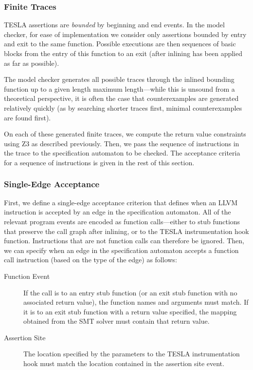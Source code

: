 \subsubsection{Finite Traces}

TESLA assertions are \emph{bounded} by beginning and end events. In the model
checker, for ease of implementation we consider only assertions bounded by entry
and exit to the same function. Possible executions are then sequences of basic
blocks from the entry of this function to an exit (after inlining has been
applied as far as possible).

The model checker generates all possible traces through the inlined bounding
function up to a given length maximum length---while this is unsound from a
theoretical perspective, it is often the case that counterexamples are generated
relatively quickly (as by searching shorter traces first, minimal
counterexamples are found first).

On each of these generated finite traces, we compute the return value
constraints using Z3 as described previously. Then, we pass the sequence of
instructions in the trace to the specification automaton to be checked. The
acceptance criteria for a sequence of instructions is given in the rest of this
section.

\subsubsection{Single-Edge Acceptance}

First, we define a single-edge acceptance criterion that defines when an LLVM
instruction is accepted by an edge in the specification automaton. All of the
relevant program events are encoded as function calls---either to stub functions
that preserve the call graph after inlining, or to the TESLA instrumentation
hook function. Instructions that are not function calls can therefore be
ignored. Then, we can specify when an edge in the specification automaton
accepts a function call instruction (based on the type of the edge) as follows:
\begin{description}
  \item[Function Event] If the call is to an entry stub function (or an exit
    stub function with no associated return value), the function
    names and arguments must match. If it is to an exit stub function with a
    return value specified, the mapping obtained from the SMT solver must
    contain that return value.
  \item[Assertion Site] The location specified by the parameters to the TESLA
    instrumentation hook must match the location contained in the assertion site
    event.
\end{description}

